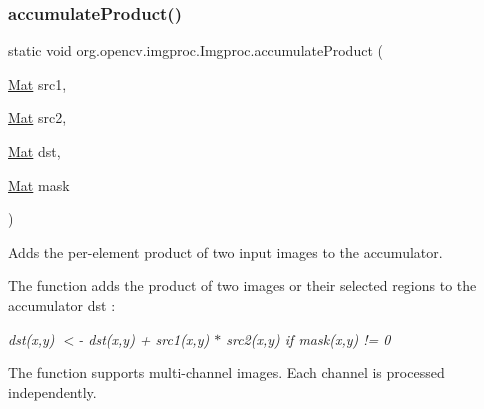 \subsubsection{\texorpdfstring{accumulate\+Product()}{accumulateProduct()}\hspace{0.1cm}{\footnotesize\ttfamily [1/2]}}
{\footnotesize\ttfamily static void org.\+opencv.\+imgproc.\+Imgproc.\+accumulate\+Product (\begin{DoxyParamCaption}\item[{\mbox{\hyperlink{classorg_1_1opencv_1_1core_1_1_mat}{Mat}}}]{src1,  }\item[{\mbox{\hyperlink{classorg_1_1opencv_1_1core_1_1_mat}{Mat}}}]{src2,  }\item[{\mbox{\hyperlink{classorg_1_1opencv_1_1core_1_1_mat}{Mat}}}]{dst,  }\item[{\mbox{\hyperlink{classorg_1_1opencv_1_1core_1_1_mat}{Mat}}}]{mask }\end{DoxyParamCaption})\hspace{0.3cm}{\ttfamily [static]}}

Adds the per-\/element product of two input images to the accumulator.

The function adds the product of two images or their selected regions to the accumulator {\ttfamily dst} \+:

{\itshape dst(x,y) $<$-\/ dst(x,y) + src1(x,y) $\ast$ src2(x,y) if mask(x,y) != 0}

The function supports multi-\/channel images. Each channel is processed independently.


